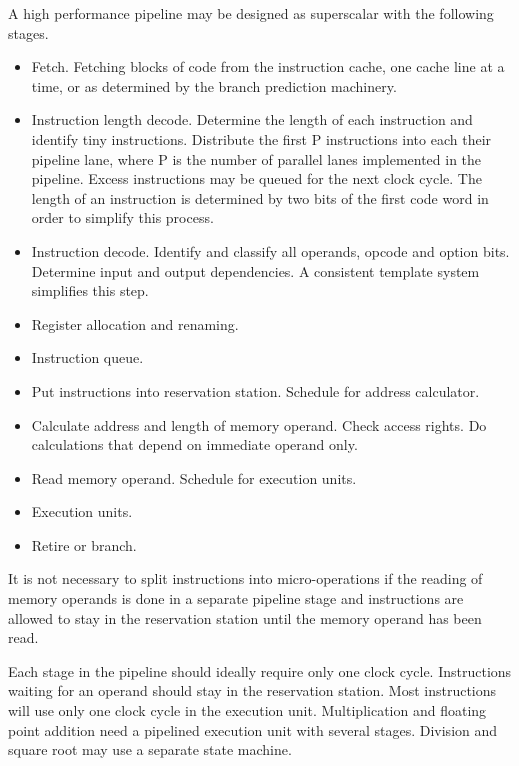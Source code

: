 \documentclass[forwardcom.tex]{subfiles}
\begin{document}
A high performance pipeline may be designed as superscalar with the following stages.
\begin{itemize}
\item  Fetch. Fetching blocks of code from the instruction cache, one cache line at a time, or as determined by the branch prediction machinery. 

\item  Instruction length decode. Determine the length of each instruction and identify tiny instructions. Distribute the first P instructions into each their pipeline lane, where P is the number of parallel lanes implemented in the pipeline. Excess instructions may be queued for the next clock cycle. The length of an instruction is determined by two bits of the first code word in order to simplify this process.

\item  Instruction decode. Identify and classify all operands, opcode and option bits. Determine input and output dependencies. A consistent template system simplifies this step.

\item  Register allocation and renaming. 

\item  Instruction queue. 

\item  Put instructions into reservation station. Schedule for address calculator. 

\item  Calculate address and length of memory operand. Check access rights. Do calculations that depend on immediate operand only.

\item  Read memory operand. Schedule for execution units.  

\item  Execution units.  

\item  Retire or branch. 
\end{itemize}

It is not necessary to split instructions into micro-operations if the reading of memory operands is done in a separate pipeline stage and instructions are allowed to stay in the reservation station until the memory operand has been read. 
\vspace{2mm}

Each stage in the pipeline should ideally require only one clock cycle. Instructions waiting for an operand should stay in the reservation station. Most instructions will use only one clock cycle in the execution unit. Multiplication and floating point addition need a pipelined execution unit with several stages. Division and square root may use a separate state machine. 
\vspace{2mm}
\end{document}
